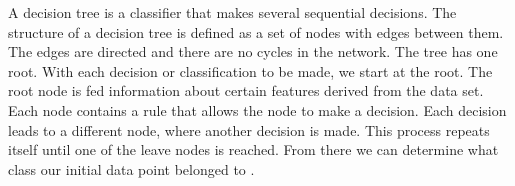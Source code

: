 \hspace{0.5cm} A decision tree is a classifier that makes several sequential decisions. The structure of a decision tree is defined as a set of nodes with edges between them. The edges are directed and there are no cycles in the network. The tree has one root. With each decision or classification to be made, we start at the root. The root node is fed information about certain features derived from the data set. Each node contains a rule that allows the node to make a decision. Each decision leads to a different node, where another decision is made. This process repeats itself until one of the leave nodes is reached. From there we can determine what class our initial data point belonged to \cite{safavian1991survey}.

